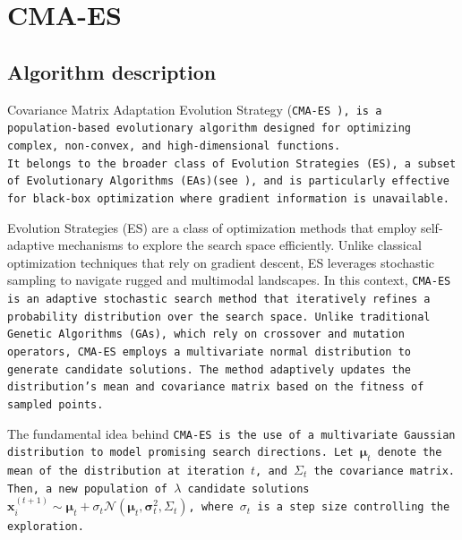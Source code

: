 \section{CMA-ES}

\subsection{Algorithm description}\label{sec:CMA}
Covariance Matrix Adaptation Evolution Strategy (\tt{CMA-ES} \cite{cmaessimplepractical}), is a population-based evolutionary algorithm designed for optimizing complex, non-convex, and high-dimensional functions.\\
It belongs to the broader class of Evolution Strategies (ES), a subset of Evolutionary Algorithms (EAs)(see \cite{sloss20192019evolutionaryalgorithmsreview}), and is particularly effective for black-box optimization where gradient information is unavailable.

Evolution Strategies (ES) are a class of optimization methods that employ self-adaptive mechanisms to explore the search space efficiently. 
Unlike classical optimization techniques that rely on gradient descent, ES leverages stochastic sampling to navigate rugged and multimodal landscapes.
In this context, \tt{CMA-ES} is an adaptive stochastic search method that iteratively refines a probability distribution over the search space. 
Unlike traditional Genetic Algorithms (GAs), which rely on crossover and mutation operators, \tt{CMA-ES} employs a multivariate normal distribution to generate candidate solutions. 
The method adaptively updates the distribution's mean and covariance matrix based on the fitness of sampled points.

The fundamental idea behind \tt{CMA-ES} is the use of a multivariate Gaussian distribution to model promising search directions. 
Let $\mathbf{\mu}_t$ denote the mean of the distribution at iteration $t$, and $\Sigma_t$ the covariance matrix. 
Then, a new population of $\lambda$ candidate solutions $\mathbf{x}_i^{(t+1)} \sim \mathbf{\mu}_t + \sigma_t\mathcal{N}(\mathbf{\mu}_t,\mathbf{\sigma}_t^2, \Sigma_t)$, where $\sigma_t$ is a step size controlling the exploration.  


